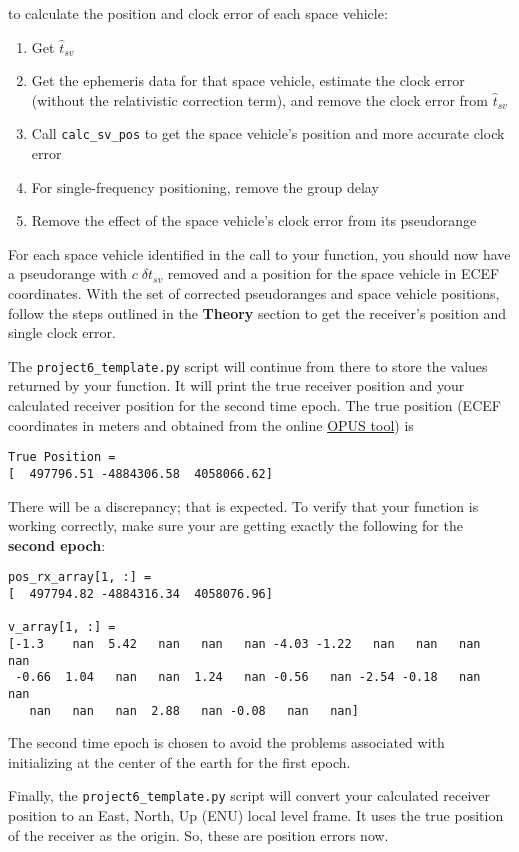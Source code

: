 \documentclass[12pt]{article}
\begin{document}
to calculate the position and clock error of each space vehicle:
\begin{enumerate}
   \item Get $\hat{t}_{sv}$
   \item Get the ephemeris data for that space vehicle, estimate the clock error
      (without the relativistic correction term), and remove the clock error
      from $\hat{t}_{sv}$
   \item Call \lstinline{calc_sv_pos} to get the space vehicle's position and
      more accurate clock error
   \item For single-frequency positioning, remove the group delay
   \item Remove the effect of the space vehicle's clock error from its
      pseudorange
\end{enumerate}
For each space vehicle identified in the call to your function, you should now
have a pseudorange with $c\; \delta t_{sv}$ removed and a position for the space
vehicle in ECEF coordinates.  With the set of corrected pseudoranges and space
vehicle positions, follow the steps outlined in the \textbf{Theory} section to
get the receiver's position and single clock error.

The \lstinline{project6_template.py} script will continue from there to store the values
returned by your function.  It will print the true receiver
position and your calculated receiver position for the second time epoch.  The true
position (ECEF coordinates in meters and obtained from the online \href{https://geodesy.noaa.gov/OPUS/}
{OPUS tool}) is
\begin{lstlisting}
True Position = 
[  497796.51 -4884306.58  4058066.62]
\end{lstlisting}
There will be a discrepancy; that is expected.  To verify that your function is
working correctly, make sure your are getting exactly the following for the \textbf{second epoch}:
\begin{lstlisting}
pos_rx_array[1, :] = 
[  497794.82 -4884316.34  4058076.96]

v_array[1, :] = 
[-1.3    nan  5.42   nan   nan   nan -4.03 -1.22   nan   nan   nan   nan
 -0.66  1.04   nan   nan  1.24   nan -0.56   nan -2.54 -0.18   nan   nan
   nan   nan   nan  2.88   nan -0.08   nan   nan]
\end{lstlisting}
The second time epoch is chosen to avoid the problems associated with
initializing at the center of the earth for the first epoch.

Finally, the \lstinline{project6_template.py} script will convert your calculated
receiver position to an East, North, Up (ENU) local level frame.  It uses the
true position of the receiver as the origin.  So, these are position errors now.
\end{document}
